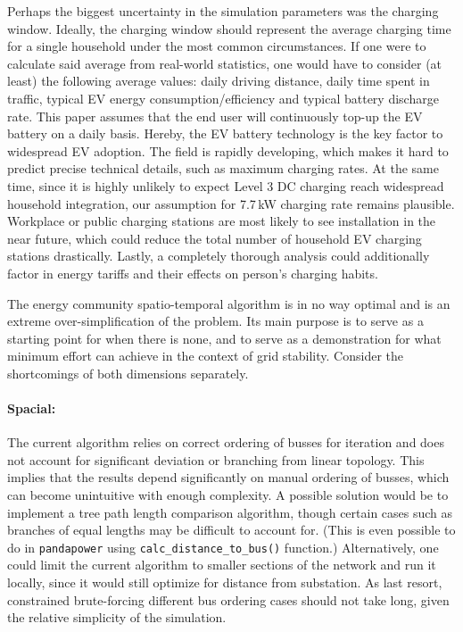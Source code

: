 \documentclass[a4paper,10pt]{report}
\begin{document}
Perhaps the biggest uncertainty in the simulation parameters was the charging window. Ideally, the charging window should represent the average charging time for a single household under the most common circumstances. If one were to calculate said average from real-world statistics, one would have to consider (at least) the following average values: daily driving distance, daily time spent in traffic, typical EV energy consumption/efficiency and typical battery discharge rate. This paper assumes that the end user will continuously top-up the EV battery on a daily basis. Hereby, the EV battery technology is the key factor to widespread EV adoption. The field is rapidly developing, which makes it hard to predict precise technical details, such as maximum charging rates. At the same time, since it is highly unlikely to expect Level 3 DC charging reach widespread household integration, our assumption for 7.7\,kW charging rate remains plausible. Workplace or public charging stations are most likely to see installation in the near future, which could reduce the total number of household EV charging stations drastically. Lastly, a completely thorough analysis could additionally factor in energy tariffs and their effects on person's charging habits.

The energy community spatio-temporal algorithm is in no way optimal and is an extreme over-simplification of the problem. Its main purpose is to serve as a starting point for when there is none, and to serve as a demonstration for what minimum effort can achieve in the context of grid stability. Consider the shortcomings of both dimensions separately.

\paragraph{Spacial:} The current algorithm relies on correct ordering of busses for iteration and does not account for significant deviation or branching from linear topology. This implies that the results depend significantly on manual ordering of busses, which can become unintuitive with enough complexity. A possible solution would be to implement a tree path length comparison algorithm, though certain cases such as branches of equal lengths may be difficult to account for. (This is even possible to do in \texttt{pandapower} using \texttt{calc\_distance\_to\_bus()} function.) Alternatively, one could limit the current algorithm to smaller sections of the network and run it locally, since it would still optimize for distance from substation. As last resort, constrained brute-forcing different bus ordering cases should not take long, given the relative simplicity of the simulation.
\end{document}
